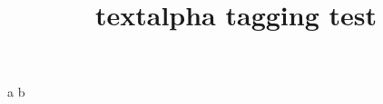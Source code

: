 \documentclass{article}
\title{textalpha tagging test}
\begin{document}
a\textsemicolon{} b


\textAlpha\par
\textBeta\par
\textGamma\par
\textDelta\par
\textEpsilon\par
\textZeta\par
\textEta\par
\textTheta\par
\textIota\par
\textKappa\par
\textLambda\par
\textMu\par
\textNu\par
\textXi\par
\textOmicron\par
\textPi\par
\textRho\par
\textSigma\par
\textTau\par
\textUpsilon\par
\textPhi\par
\textChi\par
\textPsi\par
\textOmega\par
\textalpha\par
\textbeta\par
\textgamma\par
\textdelta\par
\textepsilon\par
\textzeta\par
\texteta\par
\texttheta\par
\textiota\par
\textkappa\par
\textlambda\par
\textmu\par
\textnu\par
\textxi\par
\textomicron\par
\textpi\par
\textrho\par
\textsigma\par
\textfinalsigma\par
\textautosigma\par
\texttau\par
\textupsilon\par
\end{document}
